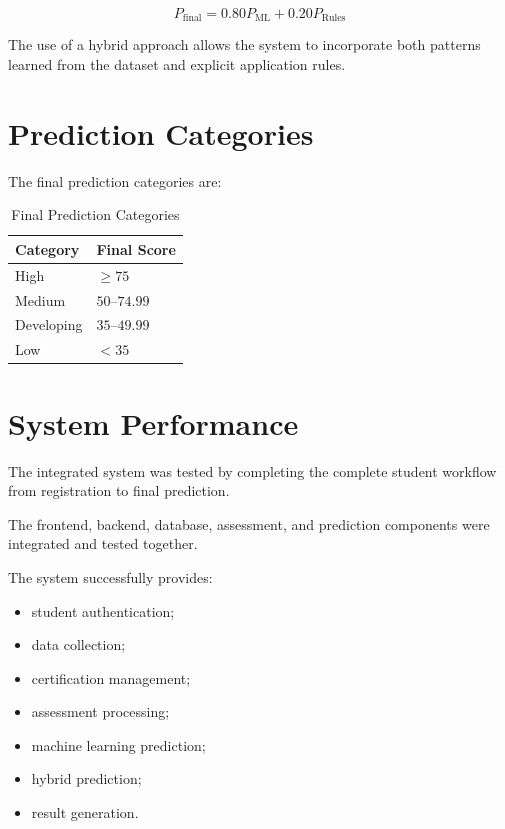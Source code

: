 \documentclass[12pt,a4paper]{report}
\begin{document}
\[
P_{\text{final}} =
0.80P_{\text{ML}} +
0.20P_{\text{Rules}}
\]

The use of a hybrid approach allows the system to incorporate
both patterns learned from the dataset and explicit application
rules.

\section{Prediction Categories}

The final prediction categories are:

\begin{table}[H]
\centering
\caption{Final Prediction Categories}

\begin{tabular}{p{}p{}}
\toprule
\textbf{Category} & \textbf{Final Score} \\
\midrule
High & $\geq 75$ \\
Medium & $50$--$74.99$ \\
Developing & $35$--$49.99$ \\
Low & $<35$ \\
\bottomrule
\end{tabular}
\end{table}

\section{System Performance}

The integrated system was tested by completing the complete
student workflow from registration to final prediction.

The frontend, backend, database, assessment, and prediction
components were integrated and tested together.

The system successfully provides:

\begin{itemize}
    \item student authentication;
    \item data collection;
    \item certification management;
    \item assessment processing;
    \item machine learning prediction;
    \item hybrid prediction;
    \item result generation.
\end{itemize}
\end{document}
